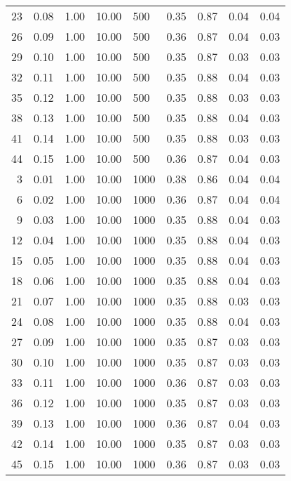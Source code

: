 \begin{table}[ht]
\begin{tabular}{rrrrlrrrr}
  23 & 0.08 & 1.00 & 10.00 & 500 & 0.35 & 0.87 & 0.04 & 0.04 \\ 
  26 & 0.09 & 1.00 & 10.00 & 500 & 0.36 & 0.87 & 0.04 & 0.03 \\ 
  29 & 0.10 & 1.00 & 10.00 & 500 & 0.35 & 0.87 & 0.03 & 0.03 \\ 
  32 & 0.11 & 1.00 & 10.00 & 500 & 0.35 & 0.88 & 0.04 & 0.03 \\ 
  35 & 0.12 & 1.00 & 10.00 & 500 & 0.35 & 0.88 & 0.03 & 0.03 \\ 
  38 & 0.13 & 1.00 & 10.00 & 500 & 0.35 & 0.88 & 0.04 & 0.03 \\ 
  41 & 0.14 & 1.00 & 10.00 & 500 & 0.35 & 0.88 & 0.03 & 0.03 \\ 
  44 & 0.15 & 1.00 & 10.00 & 500 & 0.36 & 0.87 & 0.04 & 0.03 \\ 
  3 & 0.01 & 1.00 & 10.00 & 1000 & 0.38 & 0.86 & 0.04 & 0.04 \\ 
  6 & 0.02 & 1.00 & 10.00 & 1000 & 0.36 & 0.87 & 0.04 & 0.04 \\ 
  9 & 0.03 & 1.00 & 10.00 & 1000 & 0.35 & 0.88 & 0.04 & 0.03 \\ 
  12 & 0.04 & 1.00 & 10.00 & 1000 & 0.35 & 0.88 & 0.04 & 0.03 \\ 
  15 & 0.05 & 1.00 & 10.00 & 1000 & 0.35 & 0.88 & 0.04 & 0.03 \\ 
  18 & 0.06 & 1.00 & 10.00 & 1000 & 0.35 & 0.88 & 0.04 & 0.03 \\ 
  21 & 0.07 & 1.00 & 10.00 & 1000 & 0.35 & 0.88 & 0.03 & 0.03 \\ 
  24 & 0.08 & 1.00 & 10.00 & 1000 & 0.35 & 0.88 & 0.04 & 0.03 \\ 
  27 & 0.09 & 1.00 & 10.00 & 1000 & 0.35 & 0.87 & 0.03 & 0.03 \\ 
  30 & 0.10 & 1.00 & 10.00 & 1000 & 0.35 & 0.87 & 0.03 & 0.03 \\ 
  33 & 0.11 & 1.00 & 10.00 & 1000 & 0.36 & 0.87 & 0.03 & 0.03 \\ 
  36 & 0.12 & 1.00 & 10.00 & 1000 & 0.35 & 0.87 & 0.03 & 0.03 \\ 
  39 & 0.13 & 1.00 & 10.00 & 1000 & 0.36 & 0.87 & 0.04 & 0.03 \\ 
  42 & 0.14 & 1.00 & 10.00 & 1000 & 0.35 & 0.87 & 0.03 & 0.03 \\ 
  45 & 0.15 & 1.00 & 10.00 & 1000 & 0.36 & 0.87 & 0.03 & 0.03 \\ 
   \hline
\end{tabular}
\end{table}
